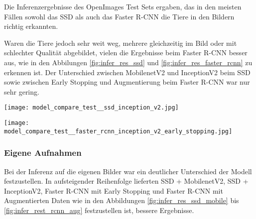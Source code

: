 Die Inferenzergebnisse des OpenImages Test Sets 
ergaben, das in den meisten Fällen sowohl das SSD
als auch das Faster R-CNN die Tiere in den Bildern 
richtig erkannten.

Waren die Tiere jedoch sehr weit weg, mehrere gleichzeitig im Bild 
oder mit schlechter Qualität abgebildet,
vielen die Ergebnisse beim Faster R-CNN besser aus, wie in 
den Abbilungen \ref{fig:infer_res_ssd} und \ref{fig:infer_res_faster_rcnn}
zu erkennen ist.
Der Unterschied zwischen MobilenetV2 und InceptionV2 beim SSD 
sowie zwischen Early Stopping und Augmentierung beim Faster R-CNN 
war nur sehr gering.

\vspace{1cm}


\begin{minipage}{0.5\textwidth}
  \centering
  \texttt{[image: model\_compare\_test\_\_ssd\_inception\_v2.jpg]}
  \label{fig:infer_res_ssd}
\end{minipage}
\begin{minipage}{0.5\textwidth}
  \centering
  \texttt{[image: model\_compare\_test\_\_faster\_rcnn\_inception\_v2\_early\_stopping.jpg]}
  \label{fig:infer_res_faster_rcnn}
\end{minipage}


\subsubsection{Eigene Aufnahmen}

Bei der Inferenz auf die eigenen Bilder 
war ein deutlicher Unterschied der Modell festzustellen.
In aufsteigender Reihenfolge lieferten SSD + MobilenetV2,
SSD + InceptionV2, Faster R-CNN mit 
Early Stopping und Faster R-CNN mit Augmentierten Daten
wie in den Abbildungen \ref{fig:infer_res_ssd_mobile}
bis \ref{fig:infer_rest_rcnn_aug} festzustellen ist, 
bessere Ergebnisse.


